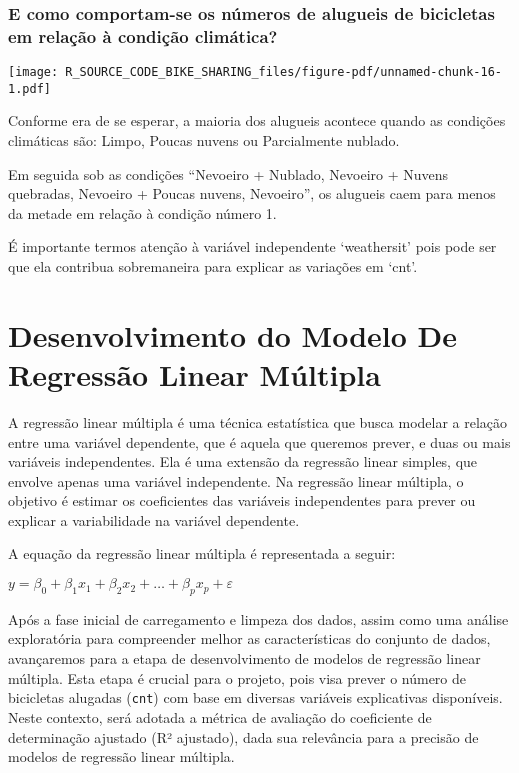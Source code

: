 \documentclass[
  letterpaper,
  DIV=11,
  numbers=noendperiod]{scrartcl}
\begin{document}
\subsubsection{E como comportam-se os números de alugueis de bicicletas
em relação à condição
climática?}\label{e-como-comportam-se-os-nuxfameros-de-alugueis-de-bicicletas-em-relauxe7uxe3o-uxe0-condiuxe7uxe3o-climuxe1tica}

\begin{center}
\texttt{[image: R\_SOURCE\_CODE\_BIKE\_SHARING\_files/figure-pdf/unnamed-chunk-16-1.pdf]}
\end{center}

Conforme era de se esperar, a maioria dos alugueis acontece quando as
condições climáticas são: Limpo, Poucas nuvens ou Parcialmente nublado.

Em seguida sob as condições ``Nevoeiro + Nublado, Nevoeiro + Nuvens
quebradas, Nevoeiro + Poucas nuvens, Nevoeiro'', os alugueis caem para
menos da metade em relação à condição número 1.

É importante termos atenção à variável independente `weathersit' pois
pode ser que ela contribua sobremaneira para explicar as variações em
`cnt'.

\section{Desenvolvimento do Modelo De Regressão Linear
Múltipla}\label{desenvolvimento-do-modelo-de-regressuxe3o-linear-muxfaltipla}

A regressão linear múltipla é uma técnica estatística que busca modelar
a relação entre uma variável dependente, que é aquela que queremos
prever, e duas ou mais variáveis independentes. Ela é uma extensão da
regressão linear simples, que envolve apenas uma variável independente.
Na regressão linear múltipla, o objetivo é estimar os coeficientes das
variáveis independentes para prever ou explicar a variabilidade na
variável dependente.

A equação da regressão linear múltipla é representada a seguir:

\(y = \beta_0 + \beta_1 x_1 + \beta_2 x_2 + \ldots + \beta_p x_p + \varepsilon\)

Após a fase inicial de carregamento e limpeza dos dados, assim como uma
análise exploratória para compreender melhor as características do
conjunto de dados, avançaremos para a etapa de desenvolvimento de
modelos de regressão linear múltipla. Esta etapa é crucial para o
projeto, pois visa prever o número de bicicletas alugadas (\texttt{cnt})
com base em diversas variáveis explicativas disponíveis. Neste contexto,
será adotada a métrica de avaliação do coeficiente de determinação
ajustado (R² ajustado), dada sua relevância para a precisão de modelos
de regressão linear múltipla.
\end{document}
